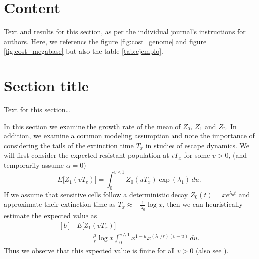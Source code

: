 \documentclass{bmcart}
\begin{document}
	
	\section*{Content}
		Text and results for this section, as per the individual journal's instructions for authors. Here, we reference the figure \ref{fig:cost_genome} and figure \ref{fig:cost_megabase} but also the table \ref{tab:ejemplo}.
	
	\section*{Section title}
		Text for this section\ldots

		In this section we examine the growth rate of the mean of $Z_0$, $Z_1$ and $Z_2$. In
		addition, we examine a common modeling assumption and note the
		importance of considering the tails of the extinction time $T_x$ in
		studies of escape dynamics.
		We will first consider the expected resistant population at $vT_x$ for
		some $v>0$, (and temporarily assume $\alpha=0$)
		\[
		E \bigl[Z_1(vT_x) \bigr]=
		\int_0^{v\wedge
			1}Z_0(uT_x)
		\exp (\lambda_1)\,du .
		\]
		If we assume that sensitive cells follow a deterministic decay
		$Z_0(t)=xe^{\lambda_0 t}$ and approximate their extinction time as
		$T_x\approx-\frac{1}{\lambda_0}\log x$, then we can heuristically
		estimate the expected value as
		\begin{equation}\label{eqexpmuts}
			\begin{aligned}[b]
				&      E\bigl[Z_1(vT_x)\bigr]\\
				&\quad      = \frac{\mu}{r}\log x
				\int_0^{v\wedge1}x^{1-u}x^{({\lambda_1}/{r})(v-u)}\,du .
			\end{aligned}
		\end{equation}
		Thus we observe that this expected value is finite for all $v>0$ (also see \cite{koon,xjon,marg,schn,koha,issnic}).
		
\end{document}
